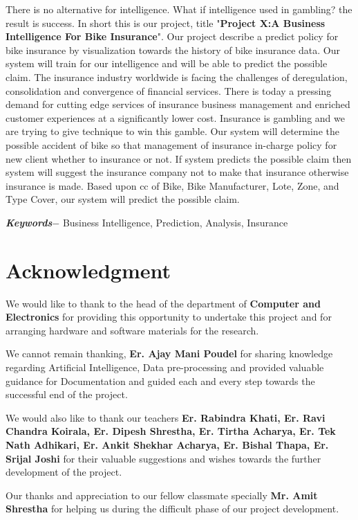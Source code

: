 There is no alternative for intelligence. What if intelligence used in gambling? the result is success. In short this is our project, title "\textbf{Project X:A Business Intelligence For Bike Insurance}". Our project describe a predict policy for bike insurance by visualization towards the history of bike insurance data. Our system will train for our intelligence and will be able to predict the possible claim. The insurance industry worldwide is facing the challenges of deregulation, consolidation and convergence of financial services. There is today a pressing demand for cutting edge services of insurance business management and enriched customer experiences at a significantly lower cost. Insurance is gambling and we are trying to give technique to win this gamble. Our system will determine the possible accident of bike so that management of insurance in-charge policy for new client whether to insurance or not. If system predicts the possible claim then system will suggest the insurance company not to make that insurance otherwise insurance is made. Based upon \acs{cc} of Bike, Bike Manufacturer, Lote, Zone, and Type Cover, our system will predict the possible claim.
\par
\textbf{\textit{Keywords$-$}} Business Intelligence, Prediction, Analysis, Insurance 

\chapter*{Acknowledgment}
We would like to thank to the head of the department of \textbf{Computer and Electronics} for providing this opportunity to undertake this project and for arranging hardware and software materials for the research.
\par
We cannot remain thanking, \textbf{Er. Ajay Mani Poudel} for sharing knowledge regarding Artificial Intelligence, Data pre-processing and provided valuable guidance for Documentation and guided each and every step towards the successful end of the project. 
\par
We would also like to thank our teachers \textbf{Er. Rabindra Khati, Er. Ravi Chandra Koirala, Er. Dipesh Shrestha, Er. Tirtha Acharya, Er. Tek Nath Adhikari, Er. Ankit Shekhar Acharya, Er. Bishal Thapa, Er. Srijal Joshi} for their valuable suggestions and wishes towards the further development of the project. 
\par 
Our thanks and appreciation to our fellow classmate specially \textbf{Mr. Amit Shrestha} for helping us during the difficult phase of our project development.

